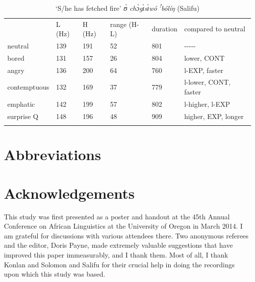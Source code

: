 \documentclass[output=paper]{langsci/langscibook}
\begin{document}
\begin{table}
\caption{‘S/he has fetched fire'  \emph{ʊ̀ chɔ̀gɪ̀sɪ̀wó \textsuperscript{!}bólíŋ}  (Salifu)}

\begin{tabular}{llllll} & L (Hz) & H (Hz) & range (H-L) & duration & compared to neutral\\
\lsptoprule
neutral & 139 & 191 & 52 & 801 & {}-{}-{}-{}-{}-\\
bored & 131 & 157 & 26 & 804 & lower, CONT\\
angry & 136 & 200 & 64 & 760 & l-EXP, faster\\
contemptuous & 132 & 169 & 37 & 779 & l-lower, CONT, faster\\
emphatic & 142 & 199 & 57 & 802 & l-higher, l-EXP\\
surprise Q & 148 & 196 & 48 & 909 & higher, EXP, longer\\
\lspbottomrule
\end{tabular}
\end{table}





\section*{Abbreviations}
\section*{Acknowledgements}
This study was first presented as a poster and handout at the 45th Annual Conference on African Linguistics at the University of Oregon in March 2014. I am grateful for discussions with various attendees there. Two anonymous referees and the editor, Doris Payne, made extremely valuable suggestions that have improved this paper immeasurably, and I thank them. Most of all, I thank Konlan and Solomon and Salifu for their crucial help in doing the recordings upon which this study was based.




{\sloppy
\printbibliography[heading=subbibliography,notkeyword=this]
}
\end{document}
